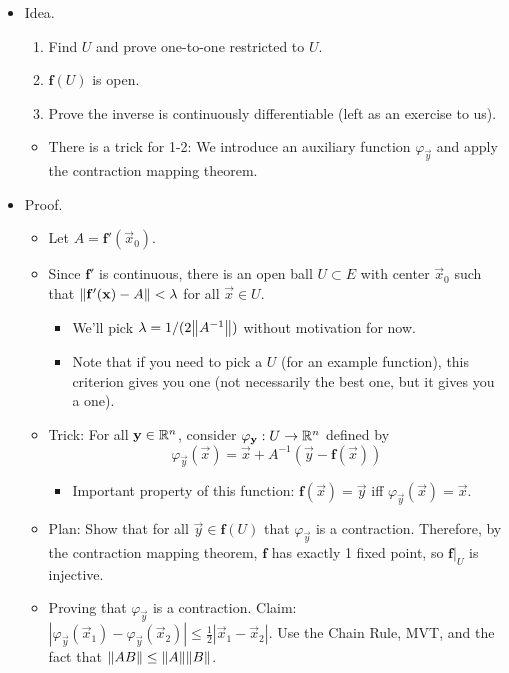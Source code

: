 \documentclass[../notes.tex]{subfiles}
\begin{document}
\begin{itemize}
    \item Idea.
    \begin{enumerate}
        \item Find $U$ and prove one-to-one restricted to $U$.
        \item $\mathbf{f}(U)$ is open.
        \item Prove the inverse is continuously differentiable (left as an exercise to us).
    \end{enumerate}
    \begin{itemize}
        \item There is a trick for 1-2: We introduce an auxiliary function $\varphi_\vec{y}$ and apply the contraction mapping theorem.
    \end{itemize}
    \item Proof.
    \begin{itemize}
        \item Let $A=\mathbf{f}'(\vec{x}_0)$.
        \item Since $\mathbf{f}'$ is continuous, there is an open ball $U\subset E$ with center $\vec{x}_0$ such that $\norm{\mathbf{f}'(\mathbf{x})-A}<\lambda$ for all $\vec{x}\in U$.
        \begin{itemize}
            \item We'll pick $\lambda=1/(2\norm{A^{-1}})$ without motivation for now.
            \item Note that if you need to pick a $U$ (for an example function), this criterion gives you one (not necessarily the best one, but it gives you a one).
        \end{itemize}
        \item Trick: For all $\mathbf{y}\in\mathbb{R}^n$, consider $\varphi_{\mathbf{y}}:U\to\mathbb{R}^n$ defined by
        \begin{equation*}
            \varphi_\vec{y}(\vec{x}) = \vec{x}+A^{-1}(\vec{y}-\mathbf{f}(\vec{x}))
        \end{equation*}
        \begin{itemize}
            \item Important property of this function: $\mathbf{f}(\vec{x})=\vec{y}$ iff $\varphi_\vec{y}(\vec{x})=\vec{x}$.
        \end{itemize}
        \item Plan: Show that for all $\vec{y}\in\mathbf{f}(U)$ that $\varphi_\vec{y}$ is a contraction. Therefore, by the contraction mapping theorem, $\mathbf{f}$ has exactly 1 fixed point, so $\mathbf{f}|_U$ is injective.
        \item Proving that $\varphi_\vec{y}$ is a contraction. Claim: $|\varphi_\vec{y}(\vec{x}_1)-\varphi_\vec{y}(\vec{x}_2)|\leq\frac{1}{2}|\vec{x}_1-\vec{x}_2|$. Use the Chain Rule, MVT, and the fact that $\norm{AB}\leq\norm{A}\norm{B}$.

\end{itemize}
\end{itemize}
\end{document}
